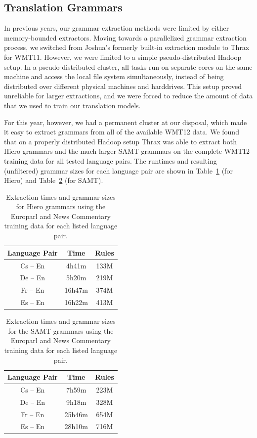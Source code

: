 \documentclass[11pt]{article}
\begin{document}
\subsection{Translation Grammars}

In previous years, our grammar extraction methods were limited by
either memory-bounded extractors. Moving towards a parallelized
grammar extraction process, we switched from Joshua's formerly
built-in extraction module to Thrax for WMT11. However, we were
limited to a simple pseudo-distributed Hadoop setup. In a
pseudo-distributed cluster, all tasks run on separate cores on the
same machine and access the local file system simultaneously, instead
of being distributed over different physical machines and harddrives.
This setup proved unreliable for larger extractions, and we were
forced to reduce the amount of data that we used to train our
translation models.

For this year, however, we had a permanent cluster at our disposal,
which made it easy to extract grammars from all of the available WMT12
data. We found that on a properly distributed Hadoop setup Thrax was
able to extract both Hiero grammars and the much larger SAMT grammars
on the complete WMT12 training data for all tested language pairs. The
runtimes and resulting (unfiltered) grammar sizes for each language
pair are shown in Table~\ref{tab-extraction-stats-hiero} (for Hiero)
and Table~\ref{tab-extraction-stats-samt} (for SAMT).

\begin{table}[!t]
\centering
\begin{tabular}{|c|c|c|}
\hline
Language Pair & Time & Rules \\
\hline\hline
Cs -- En & 4h41m & 133M \\
De -- En & 5h20m & 219M\\
Fr -- En & 16h47m & 374M \\
Es -- En & 16h22m & 413M \\
\hline
\end{tabular}
\caption{Extraction times and grammar sizes for Hiero grammars using
  the Europarl and News Commentary training data for each listed
  language pair.\label{tab-extraction-stats-hiero}} 
\end{table}

\begin{table}[!t]
\centering
\begin{tabular}{|c|c|c|}
\hline
Language Pair & Time & Rules \\
\hline\hline
Cs -- En & 7h59m & 223M \\
De -- En & 9h18m & 328M \\
Fr -- En & 25h46m & 654M \\
Es -- En & 28h10m & 716M \\
\hline
\end{tabular}
\caption{Extraction times and grammar sizes for the SAMT grammars
  using the Europarl and News Commentary training data for each listed
  language pair.\label{tab-extraction-stats-samt}}
\end{table}
\end{document}
